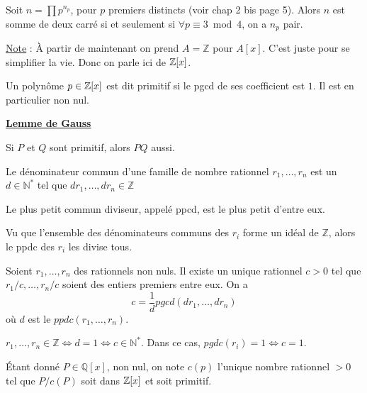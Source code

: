 \documentclass[12pt,a4paper]{article}
\begin{document}
\begin{flushleft}
\begin{cor}
Soit $n = \prod p^{n_p}$, pour $p$ premiers distincts (voir chap 2 bis page 5). Alors $n$ est somme de deux carré si et seulement si $\forall p \equiv 3 \bmod 4$, on a $n_p$ pair.
\end{cor}

\underline{Note} : À partir de maintenant on prend $A = \mathbb{Z}$ pour $A[x]$. C'est juste pour se simplifier la vie. Donc on parle ici de $\mathbb{Z} [x]$.

\begin{mydef}
Un polynôme $p \in \mathbb{Z} [x]$ est dit primitif si le pgcd de ses coefficient est $1$. Il est en particulier non nul.
\end{mydef}

\textbf{\underline{Lemme de Gauss}}
\begin{lem}
Si $P$ et $Q$ sont primitif, alors $PQ$ aussi.
\end{lem}

\begin{mydef}
Le dénominateur commun d'une famille de nombre rationnel $r_1 , \ldots , r_n$ est un $d \in \mathbb{N}^*$ tel que $dr_1, \ldots, dr_n \in \mathbb{Z}$
\end{mydef}

\begin{mydef}
Le plus petit commun diviseur, appelé ppcd, est le plus petit d'entre eux.
\end{mydef}

\begin{rem}
Vu que l'ensemble des dénominateurs communs des $r_i$ forme un idéal de $\mathbb{Z}$, alors le ppdc des $r_i$ les divise tous.
\end{rem}

\begin{lem}
Soient $r_1 , \ldots , r_n$ des rationnels non nuls. Il existe un unique rationnel $c > 0$ tel que $r_1/c , \ldots , r_n/c$ soient des entiers premiers entre eux. On a
 $$ c = \frac{1}{d} pgcd(dr_1, \ldots , dr_n) $$
où $d$ est le $ppdc(r_1 , \ldots , r_n)$.
\end{lem}

\begin{rem}
$r_1 , \ldots , r_n \in \mathbb{Z} \Leftrightarrow d = 1 \Leftrightarrow c \in \mathbb{N}^*$. Dans ce cas, $pgdc(r_i) = 1 \Leftrightarrow c = 1$. 
\end{rem}

\begin{mydef}
Étant donné $P \in \mathbb{Q}[x]$, non nul, on note $c(p)$ l'unique nombre rationnel $> 0$ tel que $P/ c(P)$ soit dans $\mathbb{Z} [x]$ et soit primitif.
\end{mydef}


\end{flushleft}
\end{document}
